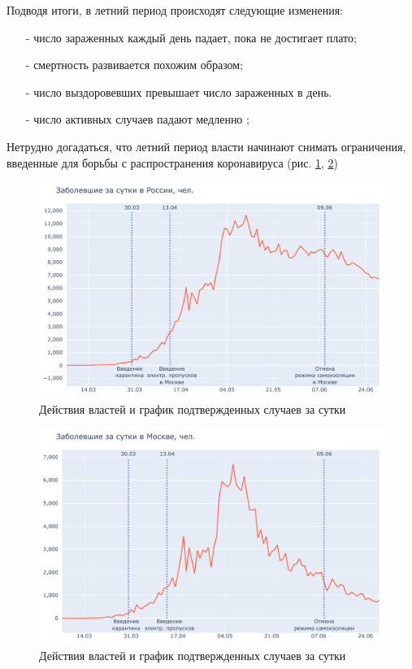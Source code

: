 \documentclass[a4paper, 12pt]{extarticle}
\begin{document}
Подводя итоги, в летний период происходят следующие
изменения:
\begin{itemize}
    \item[-] число зараженных каждый день падает, пока не достигает плато;
    \item[-] смертность развивается похожим
        образом;
    \item[-] число выздоровевших превышает число зараженных в день.
    \item[-] число активных случаев падают медленно ;
\end{itemize}

Нетрудно догадаться, что летний период власти начинают снимать ограничения,
введенные для борьбы с распространения коронавируса (рис. \ref{fig:day_confirmed_russia_with_events}, \ref{fig:day_confirmed_moscow_with_events})

\begin{figure}[h]
    \centering
    \includegraphics[scale=0.55]{../plots/7daily_confirmed_with_events_russia_1.pdf}
    \caption{Действия властей и график подтвержденных случаев за сутки}
    \label{fig:day_confirmed_russia_with_events}
\end{figure}

\begin{figure}[h]
    \centering
    \includegraphics[scale=0.55]{../plots/7daily_confirmed_with_events_moscow_1.pdf}
    \caption{Действия властей и график подтвержденных случаев за сутки}
    \label{fig:day_confirmed_moscow_with_events}
\end{figure}
\end{document}
